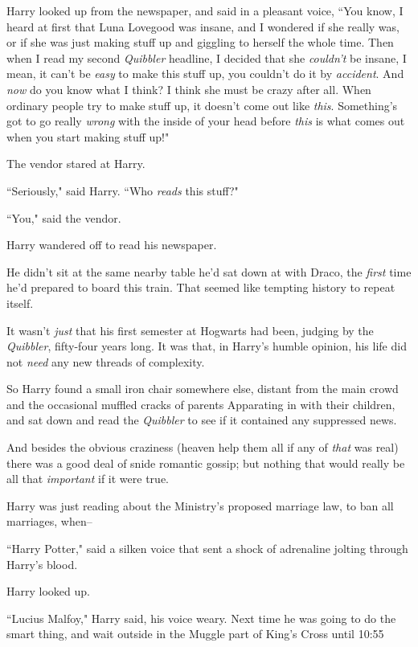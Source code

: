 Harry looked up from the newspaper, and said in a pleasant voice, ``You know, I heard at first that Luna Lovegood was insane, and I wondered if she really was, or if she was just making stuff up and giggling to herself the whole time. Then when I read my second \emph{Quibbler} headline, I decided that she \emph{couldn't} be insane, I mean, it can't be \emph{easy} to make this stuff up, you couldn't do it by \emph{accident}. And \emph{now} do you know what I think? I think she must be crazy after all. When ordinary people try to make stuff up, it doesn't come out like \emph{this}. Something's got to go really \emph{wrong} with the inside of your head before \emph{this} is what comes out when you start making stuff up!"

The vendor stared at Harry.

``Seriously," said Harry. ``Who \emph{reads} this stuff?"

``You," said the vendor.

Harry wandered off to read his newspaper.

He didn't sit at the same nearby table he'd sat down at with Draco, the \emph{first} time he'd prepared to board this train. That seemed like tempting history to repeat itself.

It wasn't \emph{just} that his first semester at Hogwarts had been, judging by the \emph{Quibbler}, fifty-four years long. It was that, in Harry's humble opinion, his life did not \emph{need} any new threads of complexity.

So Harry found a small iron chair somewhere else, distant from the main crowd and the occasional muffled cracks of parents Apparating in with their children, and sat down and read the \emph{Quibbler} to see if it contained any suppressed news.

And besides the obvious craziness (heaven help them all if any of \emph{that} was real) there was a good deal of snide romantic gossip; but nothing that would really be all that \emph{important} if it were true.

Harry was just reading about the Ministry's proposed marriage law, to ban all marriages, when\---

``Harry Potter," said a silken voice that sent a shock of adrenaline jolting through Harry's blood.

Harry looked up.

``Lucius Malfoy," Harry said, his voice weary. Next time he was going to do the smart thing, and wait outside in the Muggle part of King's Cross until 10:55\am

